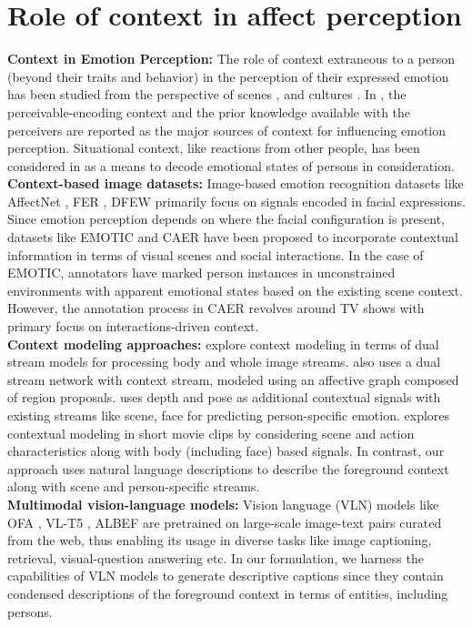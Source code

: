 \section{Role of context in affect perception}
\textbf{Context in Emotion Perception:} The role of context extraneous to a person (beyond their traits and behavior) in the perception of their expressed emotion has been studied from the perspective of scenes \cite{BarretEmotionPerception}, and cultures \cite{Masuda2008PlacingTF}. In \cite{Dudzik2019ContextIH}, the perceivable-encoding context and the prior knowledge available with the perceivers are reported as the major sources of context for influencing emotion perception.  Situational context, like reactions from other people, has been considered in \cite{Wieser2012FacesIC} as a means to decode emotional states of persons in consideration.\\
\textbf{Context-based image datasets:} Image-based emotion recognition datasets like AffectNet \cite{AffectNet}, FER \cite{BarsoumICMI2016}, DFEW \cite{DFEW} primarily focus on signals encoded in facial expressions. Since emotion perception depends on where the facial configuration is present, datasets like EMOTIC \cite{kostiPAMI} and CAER \cite{CAER-S} have been proposed to incorporate contextual information in terms of visual scenes and social interactions. In the case of EMOTIC, annotators have marked person instances in unconstrained environments with apparent emotional states based on the existing scene context. However, the annotation process in CAER revolves around TV shows with primary focus on interactions-driven context. 
\\
\textbf{Context modeling approaches:} 
\cite{kostiPAMI,CAER-S} explore context modeling in terms of dual stream models for processing body and whole image streams. \cite{CAGER} also uses a dual stream network with context stream, modeled using an affective graph composed of region proposals.\cite{Mittal2020EmotiConCM} uses depth and pose as additional contextual signals with existing streams like scene, face for predicting person-specific emotion.
\cite{pikoulis2021leveraging} explores contextual modeling in short movie clips by considering scene and action characteristics along with body (including face) based signals. In contrast, our approach uses natural language descriptions to describe the foreground context along with scene and person-specific streams.
\\
\textbf{Multimodal vision-language models:} Vision language (VLN) models like OFA \cite{wang2022ofa}, VL-T5 \cite{cho2021vlt5}, ALBEF \cite{ALBEF} are pretrained on large-scale image-text pairs curated from the web, thus enabling its usage in diverse tasks like image captioning, retrieval, visual-question answering etc. In our formulation, we harness the capabilities of VLN models to generate descriptive captions since they contain condensed descriptions of the foreground context in terms of entities, including persons.


